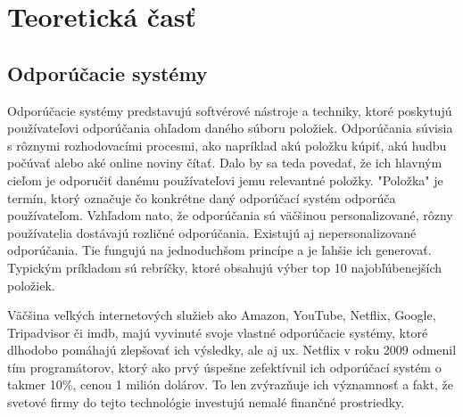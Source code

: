 \section{Teoretická časť}

\subsection{Odporúčacie systémy}
\label{sec:odporucacie systemy}
 Odporúčacie systémy predstavujú softvérové nástroje a techniky, ktoré poskytujú používateľovi odporúčania ohľadom daného súboru položiek. Odporúčania súvisia s rôznymi rozhodovacími procesmi, ako napríklad akú položku kúpiť, akú hudbu počúvať alebo aké online noviny čítať. Dalo by sa teda povedať, že ich hlavným cieľom je odporučiť danému používateľovi jemu relevantné položky. "Položka" je termín, ktorý označuje čo konkrétne daný odporúčací systém odporúča používateľom. Vzhľadom nato, že odporúčania sú väčšinou personalizované, rôzny používatelia dostávajú rozličné odporúčania. Existujú aj nepersonalizované odporúčania. Tie fungujú na jednoduchšom princípe a je ľahšie ich generovať. Typickým príkladom sú rebríčky, ktoré obsahujú výber top 10 najobľúbenejších položiek. \cite{rs1} 
 
Väčšina veľkých internetových služieb ako Amazon, YouTube, Netflix, Google, Tripadvisor či \acrshort{imdb}, majú vyvinuté svoje vlastné odporúčacie systémy, ktoré dlhodobo pomáhajú zlepšovať ich výsledky, ale aj \acrshort{ux}. Netflix v roku 2009 odmenil tím programátorov, ktorý ako prvý úspešne zefektívnil ich odporúčací systém o takmer 10\%, cenou 1 milión dolárov. To len zvýrazňuje ich významnosť a fakt, že svetové firmy do tejto technológie investujú nemalé finančné prostriedky. \cite{rs1}


